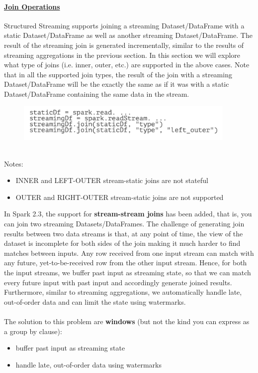 \documentclass[10pt,a4paper]{article}
\newcommand{\nline}{\\~\\}
\begin{document}
 \paragraph{\uline{Join Operations}}
 Structured Streaming supports joining a streaming Dataset/DataFrame with a static Dataset/DataFrame as well as another streaming Dataset/DataFrame. The result of the streaming join is generated incrementally, similar to the results of streaming aggregations in the previous section. In this section we will explore what type of joins (i.e. inner, outer, etc.) are supported in the above cases. Note that in all the supported join types, the result of the join with a streaming Dataset/DataFrame will be the exactly the same as if it was with a static Dataset/DataFrame containing the same data in the stream.
 \pagebreak
    \begin{figure}[ht!]
 \hfill \includegraphics[width=300pt]{images/spark-streaming-joins}
 \hspace*{\fill}
 \end{figure}  \\
 Notes:
 \begin{itemize}
 	\item INNER and LEFT-OUTER stream-static joins are not stateful
 	\item OUTER and RIGHT-OUTER stream-static joins are not supported
 \end{itemize}
 In Spark 2.3, the support for \textbf{stream-stream joins} has been added, that is, you can join two streaming Datasets/DataFrames. The challenge of generating join results between two data streams is that, at any point of time, the view of the dataset is incomplete for both sides of the join making it much harder to find matches between inputs. Any row received from one input stream can match with any future, yet-to-be-received row from the other input stream. Hence, for both the input streams, we buffer past input as streaming state, so that we can match every future input with past input and accordingly generate joined results. Furthermore, similar to streaming aggregations, we automatically handle late, out-of-order data and can limit the state using watermarks. 
 \nline
 The solution to this problem are \textbf{windows} (but not the kind you can express as a group by clause):
 \begin{itemize}
 	\item buffer past input as streaming state
 	\item handle late, out-of-order data using watermarks
 \end{itemize}
\end{document}

